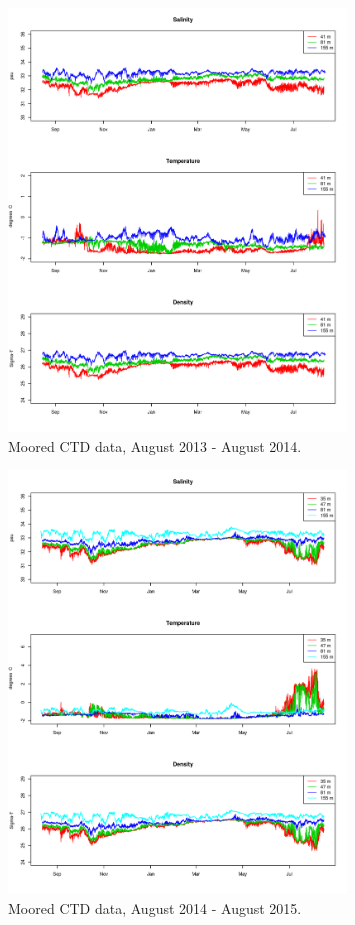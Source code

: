 \documentclass[12pt]{dforeport}
\begin{document}
\begin{figure}
\centering
\includegraphics[width = 0.8\textwidth]{./figures/07_mctd_2013_2014.png}
\caption[Moored CTD, August 2013-2014]{Moored CTD data, August 2013 - August 2014.}
\label{f:mctd_2013_2014}
\end{figure}

\begin{figure}
\centering
\includegraphics[width = 0.8\textwidth]{./figures/08_mctd_2014_2015.png}
\caption[Moored CTD, August 2014-2015]{Moored CTD data, August 2014 - August 2015.}
\label{f:mctd_2014_2015}
\end{figure}
\end{document}
